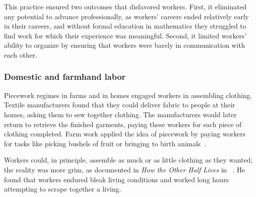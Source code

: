 \documentclass[trackingWork]{subfiles}
\begin{document}
This practice ensured two outcomes that disfavored workers.
First, it eliminated any potential to advance professionally, as
workers' careers ended relatively early in their careers,
and without formal education in mathematics they struggled to find work for which their experience was meaningful.
Second, it limited workers' ability to organize
by ensuring that workers were barely in communication with each other.



\subsubsection{Domestic and farmhand labor}

\begin{comment}
What did I pull from the threads that are related to domestic/farmwork?

- Graves: sparks of Scientific Management in Piecework, especially starting here
- 19th century: piecework was mostly cottage industry with untrained or informally trained workers
  (unlike industrial metal workers during WWII)
- Brown: Task variability matters
- Clark: pieceworkers work harder, more diligently, etc...
- Riis saw terrible conditions, documented and communicated it to the world

\citeauthor{clark1908cotton} observed textile mill pieceworkers and reported,
``When he works by the day the Italian operative wishes to leave before the whistle blows,
but if he works by the piece he will work as many hours as it is possible for him to stand''~\cite{clark1908cotton}.
\end{comment}

Piecework regimes in farms and in homes engaged workers in assembling clothing. %
Textile manufacturers found that they could deliver fabric to people at their homes, asking them to sew together clothing.
The manufacturers would later return to retrieve the finished garments,
paying these workers for each piece of clothing completed. 
Farm work applied the idea of piecework by
paying workers for tasks like picking bushels of fruit or bringing to birth animals~\cite{10.2307/2338394}.

Workers could, in principle, assemble as much or as little clothing as they wanted;
the reality was more grim, as
\citeauthor{riisOtherSideLives} documented in \textit{How the Other Half Lives} in \citeyear{riisOtherSideLives}~\cite{riisOtherSideLives}.
He found that
workers endured bleak living conditions and
worked long hours attempting to scrape together a living.
\end{document}
